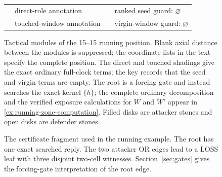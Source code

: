 \begin{figure}[tbp]
  \vspace{1ex}
  \begin{tabular}{@{}cl@{\qquad}cl@{}}
     & direct-role annotation &
     & ranked seed guard: $\varnothing$\\
     & touched-window annotation &
     & virgin-window guard: $\varnothing$
  \end{tabular}
  \caption{Tactical modules of the 15--15 running position.  Blank axial
  distance between the modules is suppressed; the coordinate lists in the
  text specify the complete position.  The direct and touched shadings give
  the exact ordinary full-clock terms; the key records that the seed and
  virgin terms are empty.  The root is a forcing gate and instead searches
  the exact kernel $\{h\}$; the complete ordinary decomposition and the
  verified exposure calculations for $W$ and $W'$ appear in
  \cref{ex:running-zone-computation}.  Filled disks are attacker stones and
  open disks are defender stones.}
  \label{fig:running-position}
\end{figure}

\begin{figure}[tbp]
  \centering
  \caption{The certificate fragment used in the running example.  The root
  has one exact searched reply.  The two attacker OR edges lead to a LOSS
  leaf with three disjoint two-cell witnesses.  Section~\ref{sec:gates}
  gives the forcing-gate interpretation of the root edge.}
  \label{fig:running-certificate}
\end{figure}

